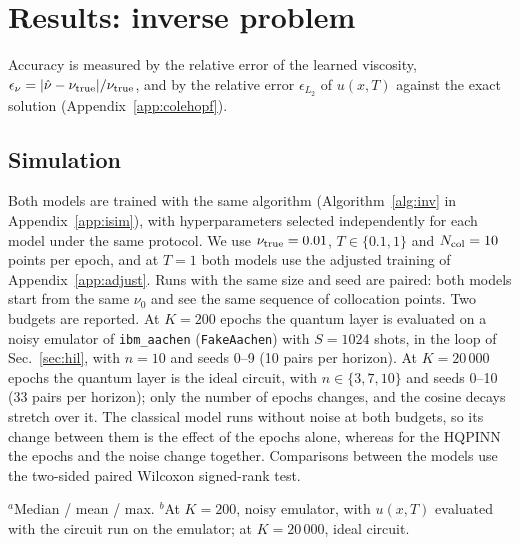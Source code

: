 \documentclass[floatfix,aps,pra,twocolumn,superscriptaddress,10pt,nofootinbib]{revtex4-2}
\newcommand{\Ncol}{N_{\rm col}}
\newcounter{algorithm}
\begin{document}
\section{Results: inverse problem}\label{sec:inverse}
Accuracy is measured by the relative error of the learned viscosity, $\epsilon_\nu=|\hat\nu-\nu_{\rm true}|/\nu_{\rm true}$, and by the relative error $\epsilon_{L_2}$ of $u(x,T)$ against the exact solution (Appendix~\ref{app:colehopf}).

\subsection{Simulation}\label{sec:i_sim}
Both models are trained with the same algorithm (Algorithm~\ref{alg:inv} in Appendix~\ref{app:isim}), with hyperparameters selected independently for each model under the same protocol. We use $\nu_{\rm true}=0.01$, $T\in\{0.1,1\}$ and $\Ncol=10$ points per epoch, and at $T=1$ both models use the adjusted training of Appendix~\ref{app:adjust}. Runs with the same size and seed are paired: both models start from the same $\nu_0$ and see the same sequence of collocation points. Two budgets are reported. At $K=200$ epochs the quantum layer is evaluated on a noisy emulator of \texttt{ibm\_aachen} (\texttt{FakeAachen}) with $S=1024$ shots, in the loop of Sec.~\ref{sec:hil}, with $n=10$ and seeds 0--9 (10 pairs per horizon). At $K=20\,000$ epochs the quantum layer is the ideal circuit, with $n\in\{3,7,10\}$ and seeds 0--10 (33 pairs per horizon); only the number of epochs changes, and the cosine decays stretch over it. The classical model runs without noise at both budgets, so its change between them is the effect of the epochs alone, whereas for the HQPINN the epochs and the noise change together. Comparisons between the models use the two-sided paired Wilcoxon signed-rank test.


\begin{table}[t]
\caption{\justifying Inverse problem: relative error of the learned viscosity, $\epsilon_\nu$, and relative $L_2$ error of $u(x,T)$, over the paired runs of each budget ($\nu_{\rm true}=0.01$, $\Ncol=10$). Wins: pairs in which the model has the smaller error; $p$: two-sided paired Wilcoxon test.}
\label{tab:inverse}
\setlength{\tabcolsep}{1pt}
\footnotesize
\begin{ruledtabular}

\end{ruledtabular}
\raggedright\footnotesize $^{a}$Median / mean / max. $^{b}$At $K=200$, noisy emulator, with $u(x,T)$ evaluated with the circuit run on the emulator; at $K=20\,000$, ideal circuit.
\end{table}
\end{document}
